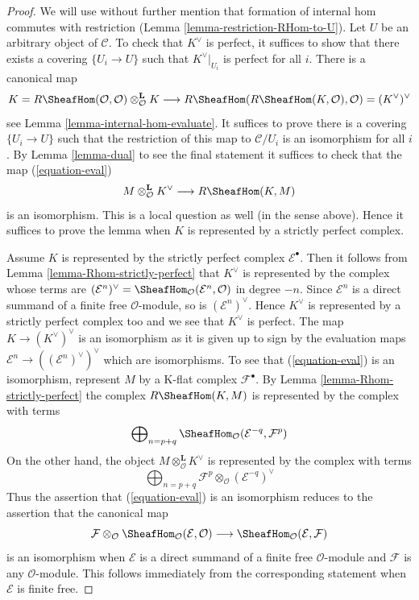 \begin{proof}
We will use without further mention that formation of internal hom commutes
with restriction (Lemma \ref{lemma-restriction-RHom-to-U}). Let $U$
be an arbitrary object of $\mathcal{C}$. To check that
$K^\vee$ is perfect, it suffices to show that there exists a covering
$\{U_i \to U\}$ such that $K^\vee|_{U_i}$ is perfect for all $i$.
There is a canonical map
$$
K = R\SheafHom(\mathcal{O}, \mathcal{O})
\otimes_{\mathcal{O}}^\mathbf{L} K \longrightarrow
R\SheafHom(R\SheafHom(K, \mathcal{O}), \mathcal{O}) =
(K^\vee)^\vee
$$
see Lemma \ref{lemma-internal-hom-evaluate}. It suffices to prove there
is a covering $\{U_i \to U\}$ such that the restriction of this map
to $\mathcal{C}/U_i$ is an isomorphism for all $i$.
By Lemma \ref{lemma-dual} to see the final statement it suffices to check
that the map (\ref{equation-eval})
$$
M \otimes^\mathbf{L}_\mathcal{O} K^\vee
\longrightarrow
R\SheafHom(K, M)
$$
is an isomorphism. This is a local question as well (in the sense above).
Hence it suffices to prove the lemma when $K$ is represented
by a strictly perfect complex.

\medskip\noindent
Assume $K$ is represented by the strictly perfect complex
$\mathcal{E}^\bullet$. Then it follows from
Lemma \ref{lemma-Rhom-strictly-perfect}
that $K^\vee$ is represented by the complex whose terms are
$(\mathcal{E}^n)^\vee =
\SheafHom_\mathcal{O}(\mathcal{E}^n, \mathcal{O})$
in degree $-n$. Since $\mathcal{E}^n$ is a direct summand of a finite
free $\mathcal{O}$-module, so is $(\mathcal{E}^n)^\vee$.
Hence $K^\vee$ is represented by a strictly perfect complex too 
and we see that $K^\vee$ is perfect.
The map $K \to (K^\vee)^\vee$ is an isomorphism as it is given up
to sign by the evaluation maps
$\mathcal{E}^n \to ((\mathcal{E}^n)^\vee)^\vee$ which are
isomorphisms. To see that (\ref{equation-eval}) is an isomorphism, represent
$M$ by a K-flat complex $\mathcal{F}^\bullet$.
By Lemma \ref{lemma-Rhom-strictly-perfect} the complex
$R\SheafHom(K, M)$ is represented by the complex with terms
$$
\bigoplus\nolimits_{n = p + q}
\SheafHom_\mathcal{O}(\mathcal{E}^{-q}, \mathcal{F}^p)
$$
On the other hand, the object $M \otimes^\mathbf{L}_\mathcal{O} K^\vee$
is represented by the complex with terms
$$
\bigoplus\nolimits_{n = p + q}
\mathcal{F}^p \otimes_\mathcal{O} (\mathcal{E}^{-q})^\vee
$$
Thus the assertion that (\ref{equation-eval}) is an isomorphism
reduces to the assertion that the canonical map
$$
\mathcal{F}
\otimes_\mathcal{O}
\SheafHom_\mathcal{O}(\mathcal{E}, \mathcal{O})
\longrightarrow
\SheafHom_\mathcal{O}(\mathcal{E}, \mathcal{F})
$$
is an isomorphism when $\mathcal{E}$ is a direct summand of a finite
free $\mathcal{O}$-module and $\mathcal{F}$ is any $\mathcal{O}$-module.
This follows immediately from the corresponding statement when
$\mathcal{E}$ is finite free.
\end{proof}

